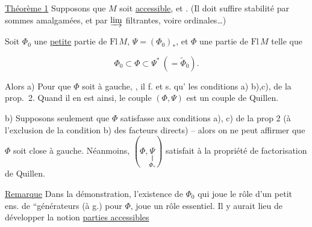 

\uline{Théorème 1} Supposons que $M$ soit \uline{accessible}, et  . (Il doit suffire stabilité par sommes amalgamées, et par $\varinjlim$ filtrantes, voire ordinales\ldots)

 Soit $\Phi_0$ une \uline{petite} partie de $\mathrm{Fl}\,M$,  $\Psi=(\Phi_0)_*$, et $\Phi$ une partie de $\mathrm{Fl}\,M$ telle que

\[ \Phi_0\subset\Phi\subset\Psi^*\ (= \widetilde{\Phi}_0). \]

Alors a) Pour que $\Phi$ soit   à gauche, , il f. et s. qu'  les conditions a) b),c), de la prop.~2. Quand il en est ainsi, le couple $(\Phi,\Psi)$ est un couple de Quillen.

b) Supposons seulement que $\Phi$ satisfasse aux conditions a), c) de la prop 2 (à l'exclusion de la condition b) des facteurs directs) -- alors on ne peut affirmer que $\Phi$ soit close à gauche. Néanmoins, $(\Phi,\underset{\Phi_*}{\underset{\Vert}{\Psi}})$ satisfait à la propriété de factorisation de Quillen.

\uline{Remarque} Dans la démonstration, l'existence de  $\Phi_0$\inserted{$\subset\Phi$,} qui joue le rôle d'un petit ens. de ``générateurs  (à g.) pour $\Phi$, joue un rôle essentiel. Il y aurait lieu de développer la notion  \uline{parties accessibles}


